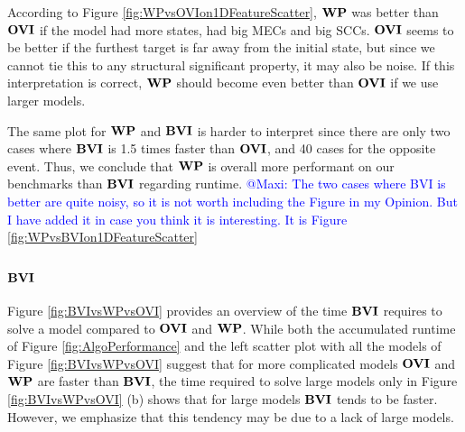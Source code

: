 According to Figure \ref{fig:WPvsOVIon1DFeatureScatter}, $\mathbf{WP}$ was better than $\mathbf{OVI}$ if the model had more states, had big MECs and big SCCs.
$\mathbf{OVI}$ seems to be better if the furthest target is far away from the initial state, but since we cannot tie this to any structural significant property,
it may also be noise. If this interpretation is correct, $\mathbf{WP}$ should become even better than $\mathbf{OVI}$ if we use larger models.

The same plot for $\mathbf{WP}$ and $\mathbf{BVI}$ is harder to interpret since there are only two cases where $\mathbf{BVI}$ is 1.5 times faster than $\mathbf{OVI}$, and 40 cases
for the opposite event. Thus, we conclude that $\mathbf{WP}$ is overall more performant on our benchmarks than $\mathbf{BVI}$ regarding runtime. 
\textcolor{blue}{@Maxi: The two cases where BVI is better are quite noisy, so it is not worth including the Figure in my Opinion.
But I have added it in case you think it is interesting. It is Figure \ref{fig:WPvsBVIon1DFeatureScatter}}
\fi

\subsubsection*{\underline{$\mathbf{BVI}$}}

Figure \ref{fig:BVIvsWPvsOVI} provides an overview of the time $\mathbf{BVI}$ requires to solve a model compared to $\mathbf{OVI}$ and $\mathbf{WP}$.
While both the accumulated runtime of Figure \ref{fig:AlgoPerformance} and the left scatter plot with all the models of Figure \ref{fig:BVIvsWPvsOVI}
suggest that for more complicated models $\mathbf{OVI}$ and $\mathbf{WP}$ are faster than $\mathbf{BVI}$, the time required to solve large models only in Figure \ref{fig:BVIvsWPvsOVI} (b)
shows that for large models $\mathbf{BVI}$ tends to be faster. However, we emphasize that this tendency may be due to a lack of large models.

